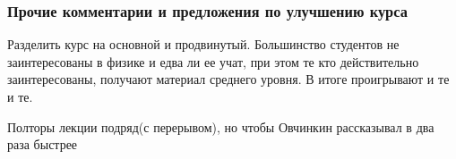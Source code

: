     
    \subsubsection{Прочие комментарии и предложения по улучшению курса}
	    \begin{commentbox}
			Разделить курс на основной и продвинутый. Большинство студентов не заинтересованы в физике и едва ли ее учат, при этом те кто действительно заинтересованы, получают материал среднего уровня. В итоге проигрывают и те и те.
		\end{commentbox}

		\begin{commentbox}
			Полторы лекции подряд(с перерывом), но чтобы Овчинкин рассказывал в два раза быстрее
		\end{commentbox}